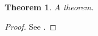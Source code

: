 \documentclass{article}
\newtheorem{theorem}{Theorem}
\begin{document}
\begin{refsection}
\begin{theorem}\label{t}A theorem.\end{theorem}
\begin{proof}See \cite{knuth}.\end{proof}
\printbibliography
\end{refsection}
\end{document}
